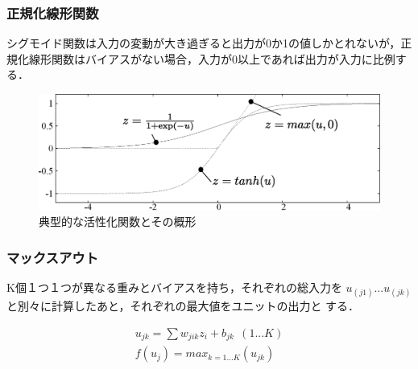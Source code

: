 \documentclass[a4paper,10pt]{jsarticle}
\begin{document}
\subsubsection{正規化線形関数}
シグモイド関数は入力の変動が大き過ぎると出力が0か1の値しかとれないが，正
規化線形関数はバイアスがない場合，入力が0以上であれば出力が入力に比例す
る．
\begin{figure}[t]
 \centering
 \includegraphics[scale=0.55]{../04th/fig/sigmoid.eps}
    \caption{典型的な活性化関数とその概形}
		\label{sigmoid}
\end{figure}
\subsubsection{マックスアウト}
K個１つ１つが異なる重みとバイアスを持ち，それぞれの総入力を
$u_(j1)$...$u_(jk)$と別々に計算したあと，それぞれの最大値をユニットの出力と
する．

\begin{align}
 u_{jk}=\sum w_{jik}z_i +b_{jk}\ \ (1...K)\\
 f(u_{j})=max_{k=1...K}(u_{jk})
\end{align}
\end{document}
